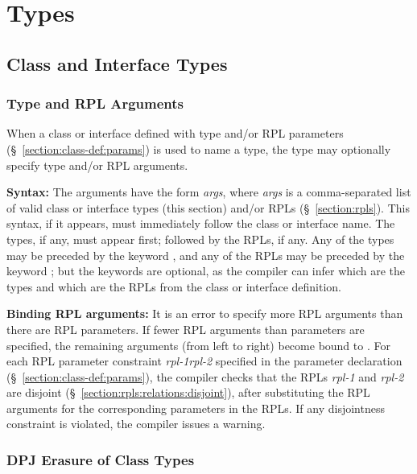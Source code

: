 \section{Types}
\label{section:types}

\subsection{Class and Interface Types}
\label{section:types:class}

\subsubsection{Type and RPL Arguments}
\label{section:types:class:args}

When a class or interface defined with type and/or RPL parameters
(\S~\ref{section:class-def:params}) is used to name a type, the type
may optionally specify type and/or RPL arguments.

\noindent
\textbf{Syntax:} The arguments have the form
\kwd{<}\emph{args}\kwd{>}, where \emph{args} is a comma-separated list
of valid class or interface types (this section) and/or RPLs
(\S~\ref{section:rpls}).  This syntax, if it appears, must immediately
follow the class or interface name. The types, if any, must appear
first; followed by the RPLs, if any.  Any of the types may be preceded
by the keyword , and any of the RPLs may be preceded by the
keyword ; but the keywords are optional, as the compiler
can infer which are the types and which are the RPLs from the class or
interface definition.

\noindent
\textbf{Binding RPL arguments:} It is an error to specify more RPL
arguments than there are RPL parameters.  If fewer RPL arguments than
parameters are specified, the remaining arguments (from left to right)
become bound to .  For each RPL parameter constraint
\emph{rpl-1}\kwd{ \# }\emph{rpl-2} specified in the parameter
declaration (\S~\ref{section:class-def:params}), the compiler checks
that the RPLs \emph{rpl-1} and \emph{rpl-2} are disjoint
(\S~\ref{section:rpls:relations:disjoint}), after substituting the RPL
arguments for the corresponding parameters in the RPLs.  If any
disjointness constraint is violated, the compiler issues a warning.

\subsubsection{DPJ Erasure of Class Types}
\label{section:types:class:dpjerasure}

